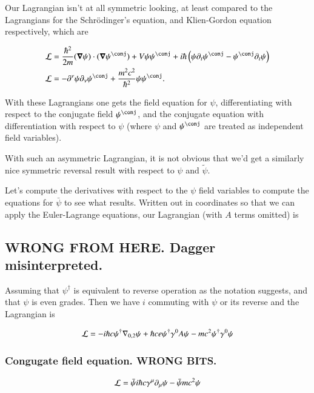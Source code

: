 \documentclass{article}
\begin{document}
Our Lagrangian isn't at all symmetric looking, at least compared to the Lagrangians for the 
Schr\"{o}dinger's equation, and Klien-Gordon equation respectively, which are

\begin{align}
\LL &= \frac{\hbar^2}{2m}
(\spacegrad \psi) \cdot (\spacegrad \psi^\conj) + V \psi \psi^\conj + {i \hbar} \left( \psi \partial_t \psi^\conj - \psi^\conj \partial_t \psi \right) \\
\LL &= -\partial^\nu \psi \partial_\nu \psi^\conj + \frac{m^2 c^2}{\hbar^2} \psi \psi^\conj.
\end{align}

With these Lagrangians one gets the field equation for $\psi$, differentiating with respect to the conjugate field $\psi^\conj$, and the conjugate equation with differentiation with respect to $\psi$ (where $\psi$ and $\psi^\conj$ are treated as independent field variables).

With such an asymmetric Lagrangian, it is not obvious that we'd get a similarly nice symmetric reversal result with respect to $\psi$ and $\tilde{\psi}$.

Let's compute the derivatives with respect to the $\psi$ field variables to compute the equations for $\bar \psi$ to see what results.  Written out in coordinates so that we can apply the Euler-Lagrange equations, our Lagrangian (with $A$ terms omitted) is

\subsection{ WRONG FROM HERE. Dagger misinterpreted. }

Assuming that $\psi^\dagger$ is equivalent to reverse operation as the notation suggests, and that $\psi$ is even grades.  Then we have $i$ commuting with $\psi$ or its reverse and the Lagrangian is

\begin{align}\label{eqn:lag2busted}
\mathcal{L} 
= 
-i \hbar c \psi^\dagger {\nabla}_{0,2} \psi
+ \hbar c e \psi^\dagger \gamma^0 A \psi
- m c^2 \psi^\dagger \gamma^0 \psi
\end{align}

\subsubsection{ Congugate field equation. WRONG BITS. }

\begin{align}\label{eqn:lagNoA}
\mathcal{L} = \bar\psi i \hbar c \gamma^\mu \partial_\mu \psi - \bar \psi m c^2 \psi
\end{align}
\end{document}
